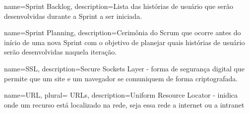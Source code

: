  {
    name={Sprint Backlog},
    description={Lista das histórias de usuário que serão desenvolvidas durante a Sprint a ser iniciada.}
}

 {
    name={Sprint Planning},
    description={Cerimônia do Scrum que ocorre antes do início
    de uma nova Sprint com o objetivo de planejar quais histórias
    de usuário serão desenvolvidas naquela iteração.}
}

 {
    name={SSL},
    description={Secure Sockets Layer - forma de segurança digital que permite que um site e um navegador se comuniquem de forma criptografada.}
}

 {
	name=URL,
	plural= {URLs},
	description={Uniform Resource Locator - inidica onde um recurso está 				localizado na rede, seja essa rede a internet ou a intranet}
}


